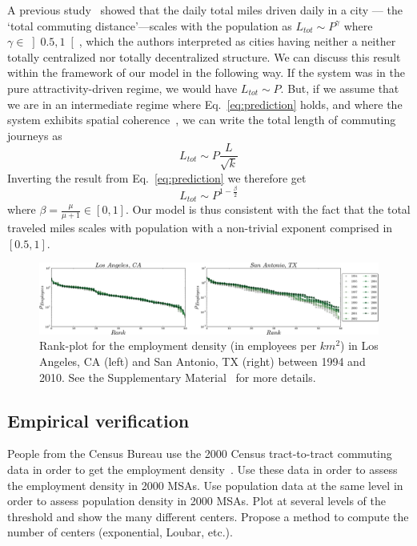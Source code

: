 A previous study~\cite{Samaniego:2008} showed that the daily total
miles driven daily in a city --- the `total commuting
distance'---scales with the population as $L_{tot} \sim P^\gamma$
where $\gamma \in \left] 0.5, 1\right[$, which the authors interpreted
as cities having neither a neither totally centralized nor totally
decentralized structure. We can discuss this result within the
framework of our model in the following way. If the system was in the
pure attractivity-driven regime, we would have $L_{tot} \sim P$. But, if we
assume that we are in an intermediate regime where
Eq.~\ref{eq:prediction} holds, and where the system exhibits spatial
coherence~\cite{SM}, we can write the total length of commuting
journeys as
%
\begin{equation}
L_{tot} \sim P \frac{L}{\sqrt{k}}
\end{equation} 
%
Inverting the result from Eq.~\ref{eq:prediction} we therefore get
%
\begin{equation}
L_{tot} \sim P^{1-\frac{\beta}{2}}
\label{eq:beta}
\end{equation}
%
where $\beta = \frac{\mu}{\mu+1} \in \left[0 , 1\right]$. Our model is
thus consistent with the fact that the total traveled miles scales with
population with a non-trivial exponent comprised in $[0.5,1]$.\\


\begin{figure}
\includegraphics[width=\textwidth]{gfx/chapter-monocentric/4.pdf}
\caption{Rank-plot for the employment density (in employees per
  $km^2$) in Los Angeles, CA (left) and San Antonio, TX (right)
  between 1994 and 2010. See the Supplementary Material~\cite{SM} for more details. \label{fig:rank_plots}}
\end{figure}

    \subsection{Empirical verification}
    \label{sub:empirical_verification}
    
People from the Census Bureau use the 2000 Census tract-to-tract commuting data
in order to get the employment density~\cite{Marlay:2010}. Use these data in
order to assess the employment density in 2000 MSAs. Use population data at the
same level in order to assess population density in 2000 MSAs.
Plot at several levels of the threshold and show the many different centers.
Propose a method to compute the number of centers (exponential, Loubar, etc.).\\
